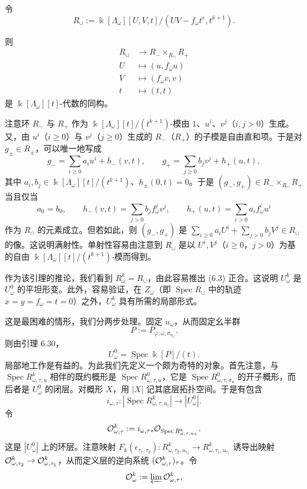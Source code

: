 \begin{lemma}
令
\[
  R_\cup:=\Bbbk[\Lambda_\omega][U,V,t]/(UV-f_\omega t^e,t^{k+1}).
\]

则
\[
  \begin{aligned}
    R_\cup&\to R_-\times_{R_\cap}R_+\\
    U&\mapsto(u,f_\omega u)\\
    V&\mapsto(f_\omega v,v)\\
    t&\mapsto(t,t)
  \end{aligned}
\]
是 $\Bbbk[\Lambda_\omega][t]$-代数的同构。
\end{lemma}

注意环 $R_-$ 与 $R_+$ 作为 $\Bbbk[\Lambda_\omega][t]/(t^{k+1})$-模由 $1$、$u^i$、$v^j$（$i,j>0$）生成。又，由 $u^i$（$i\ge0$）与 $v^j$（$j\ge0$）生成的 $R_-$（$R_+$）的子模是自由直和项。于是对 $g_\pm\in R_\pm$，可以唯一地写成
\[
  g_-=\sum_{i\ge0}a_iu^i+h_-(v,t),\qquad
  g_+=\sum_{j\ge0}b_jv^j+h_+(u,t),
\]
其中 $a_i,b_j\in\Bbbk[\Lambda_\omega][t]/(t^{k+1})$、$h_\pm(0,t)=0$。于是 $(g_-,g_+)\in R_-\times_{R_\cap}R_+$ 当且仅当
\[
  a_0=b_0,\qquad
  h_-(v,t)=\sum_{j>0}b_jf_\omega^jv^j,\qquad
  h_+(u,t)=\sum_{i>0}a_if_\omega^iu^i
\]
作为 $R_\cap$ 的元素成立。但若如此，则 $(g_-,g_+)$ 是 $\sum_{i\ge0}a_iU^i+\sum_{j>0}b_jV^j\in R_\cup$ 的像。这说明满射性。单射性容易由注意到 $R_\cup$ 是以 $U^i,V^j$（$i\ge0$，$j>0$）为基的自由 $\Bbbk[\Lambda_\omega][t]/(t^{k+1})$-模而得到。

作为该引理的推论，我们看到 $R^k_\omega=R_\cup$，由此容易推出 (6.3) 正合。这说明 $U^k_\omega$ 是 $U^0_\omega$ 的平坦形变。此外，容易验证，在 $Z_\omega$（即 $\operatorname{Spec}R_\cup$ 中的轨迹 $x=y=f_\omega=t=0$）之外，$U^k_\omega$ 具有所需的局部形式。


这是最困难的情形，我们分两步处理。固定 $u_\omega$，从而固定幺半群
\[
  P:=P_{\varphi,\omega,\sigma_{u_\omega}}.
\]
则由引理 6.30，
\[
  U^0_\omega=\operatorname{Spec}\Bbbk[P]/(t).
\]
局部地工作是有益的。为此我们先定义一个颇为奇特的对象。首先注意，与 $\operatorname{Spec}R^k_{\omega,\tau,u}$ 相伴的既约概形是 $\operatorname{Spec}R^0_{\omega,\tau,u}$，它是 $\operatorname{Spec}R^0_{\omega,\tau,\sigma_u}$ 的开子概形，而后者是 $U^0_\omega$ 的闭层。对概形 $X$，用 $|X|$ 记其底层拓扑空间。于是有包含
\[
  i_{\omega,\tau}:|\operatorname{Spec}R^k_{\omega,\tau,u_\tau}|\to|U^0_\omega|.
\]
令
\[
  \mathcal{O}^k_{\omega,\tau}:=i_{\omega,\tau*}\mathcal{O}_{\operatorname{Spec}R^k_{\omega,\tau,u_\tau}}.
\]
这是 $|U^0_\omega|$ 上的环层。注意映射 $F_k(\epsilon_{\tau_1,\tau_2}):R^k_{\omega,\tau_2,u_{\tau_2}}\to R^k_{\omega,\tau_1,u_{\tau_1}}$ 诱导出映射 $\mathcal{O}^k_{\omega,\tau_2}\to\mathcal{O}^k_{\omega,\tau_1}$，从而定义层的逆向系统 $(\mathcal{O}^k_{\omega,\tau})_\tau$。令
\[
  \mathcal{O}^k_\omega:=\varprojlim\mathcal{O}^k_{\omega,\tau},
\]

